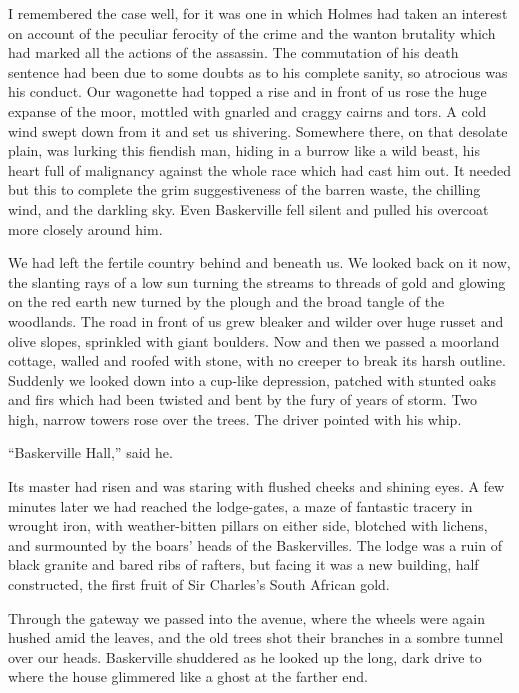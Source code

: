 \documentclass[paper=a5,BCOR=7mm,twoside,DIV=calc,12pt,usegeometry,openany,chapterprefix,endperiod,headings=big]{scrbook} %
\begin{document}
I remembered the case well, for it was one in which Holmes had taken an interest on account of the peculiar ferocity of the crime and the wanton brutality which had marked all the actions of the assassin. The commutation of his death sentence had been due to some doubts as to his complete sanity, so atrocious was his conduct. Our wagonette had topped a rise and in front of us rose the huge expanse of the moor, mottled with gnarled and craggy cairns and tors. A cold wind swept down from it and set us shivering. Somewhere there, on that desolate plain, was lurking this fiendish man, hiding in a burrow like a wild beast, his heart full of malignancy against the whole race which had cast him out. It needed but this to complete the grim suggestiveness of the barren waste, the chilling wind, and the darkling sky. Even Baskerville fell silent and pulled his overcoat more closely around him.

We had left the fertile country behind and beneath us. We looked back on it now, the slanting rays of a low sun turning the streams to threads of gold and glowing on the red earth new turned by the plough and the broad tangle of the woodlands. The road in front of us grew bleaker and wilder over huge russet and olive slopes, sprinkled with giant boulders. Now and then we passed a moorland cottage, walled and roofed with stone, with no creeper to break its harsh outline. Suddenly we looked down into a cup-like depression, patched with stunted oaks and firs which had been twisted and bent by the fury of years of storm. Two high, narrow towers rose over the trees. The driver pointed with his whip.

\enquote{Baskerville Hall,} said he.

Its master had risen and was staring with flushed cheeks and shining eyes. A few minutes later we had reached the lodge-gates, a maze of fantastic tracery in wrought iron, with weather-bitten pillars on either side, blotched with lichens, and surmounted by the boars' heads of the Baskervilles. The lodge was a ruin of black granite and bared ribs of rafters, but facing it was a new building, half constructed, the first fruit of Sir Charles's South African gold.

Through the gateway we passed into the avenue, where the wheels were again hushed amid the leaves, and the old trees shot their branches in a sombre tunnel over our heads. Baskerville shuddered as he looked up the long, dark drive to where the house glimmered like a ghost at the farther end.
\end{document}
